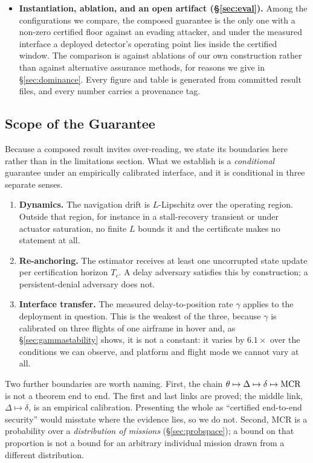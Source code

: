\begin{itemize}
\item \textbf{Instantiation, ablation, and an open artifact
(\S\ref{sec:eval}).} Among the configurations we compare, the composed guarantee
is the only one with a non-zero certified floor against an evading attacker, and
under the measured interface a deployed detector's operating point lies inside
the certified window. The comparison is against ablations of our own
construction rather than against alternative assurance methods, for reasons we
give in \S\ref{sec:dominance}. Every figure and table is generated from
committed result files, and every number carries a provenance tag.
\end{itemize}

\subsection*{Scope of the Guarantee}
\label{sec:scope}
Because a composed result invites over-reading, we state its boundaries here
rather than in the limitations section. What we establish is a
\emph{conditional} guarantee under an empirically calibrated interface, and it
is conditional in three separate senses.

\begin{enumerate}[label=(C\arabic*),leftmargin=2.6em]
\item\label{c:lip} \textbf{Dynamics.} The navigation drift is $L$-Lipschitz over
the operating region. Outside that region, for instance in a stall-recovery
transient or under actuator saturation, no finite $L$ bounds it and the
certificate makes no statement at all.
\item\label{c:anchor} \textbf{Re-anchoring.} The estimator receives at least one
uncorrupted state update per certification horizon $T_c$. A delay adversary
satisfies this by construction; a persistent-denial adversary does not.
\item\label{c:interface} \textbf{Interface transfer.} The measured
delay-to-position rate $\gamma$ applies to the deployment in question. This is
the weakest of the three, because $\gamma$ is calibrated on three flights of one
airframe in hover and, as \S\ref{sec:gammastability} shows, it is not a
constant: it varies by $6.1\times$ over the conditions we can observe, and
platform and flight mode we cannot vary at all.
\end{enumerate}

Two further boundaries are worth naming. First, the chain
$\theta\mapsto\Delta\mapsto\delta\mapsto\mathrm{MCR}$ is not a theorem end to end. The
first and last links are proved; the middle link, $\Delta\mapsto\delta$, is an
empirical calibration. Presenting the whole as ``certified end-to-end security''
would misstate where the evidence lies, so we do not. Second, MCR is a
probability over a \emph{distribution of missions}
(\S\ref{sec:probspace}); a bound on that proportion is not a bound for an
arbitrary individual mission drawn from a different distribution.

